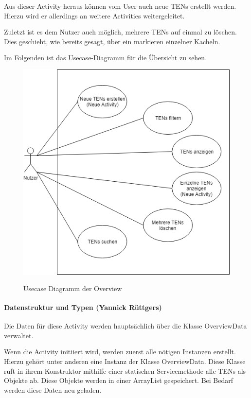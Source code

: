Aus dieser Activity heraus können vom User auch neue TENs erstellt werden. Hierzu wird er allerdings an weitere Activities weitergeleitet.

Zuletzt ist es dem Nutzer auch möglich, mehrere TENs auf einmal zu löschen. Dies geschieht, wie bereits gesagt, über ein markieren einzelner Kacheln.

Im Folgenden ist das Usecase-Diagramm für die Übersicht zu sehen.

\begin{figure}[H]
\centering
\begin{minipage}[t]{1\textwidth} %
\caption{Usecase Diagramm der Overview} %
\includegraphics[width=1\textwidth]{img/Usecase_Overview}\\ %
\end{minipage}
\end{figure}

\paragraph{Datenstruktur und Typen (Yannick Rüttgers)}
Die Daten für diese Activity werden hauptsächlich über die Klasse OverviewData verwaltet.

Wenn die Activity initiiert wird, werden zuerst alle nötigen Instanzen erstellt. Hierzu gehört unter anderen eine Instanz der Klasse OverviewData. Diese Klasse ruft in ihrem Konstruktor mithilfe einer statischen Servicemethode alle TENs als Objekte ab. Diese Objekte werden in einer ArrayList gespeichert. Bei Bedarf werden diese Daten neu geladen.

